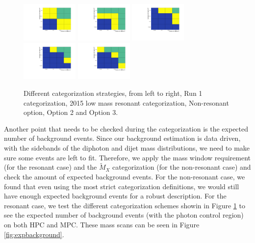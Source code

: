 \begin{figure}[thb]
  \centering
  \includegraphics[width=0.25\textwidth]{figures/sec-cats/catPlot_Run1}\hfil
  \includegraphics[width=0.25\textwidth]{figures/sec-cats/catPlot_2015}\hfil
  \includegraphics[width=0.25\textwidth]{figures/sec-cats/catPlot_NonRes}\hfil
  \includegraphics[width=0.25\textwidth]{figures/sec-cats/catPlot_DEF2}\hfil
  \includegraphics[width=0.25\textwidth]{figures/sec-cats/catPlot_DEF3}\hfil
  \caption{Different categorization strategies, from left to right, Run 1 categorization, 2015 low mass resonant categorization, Non-resonant option, Option 2 and Option 3.}
  \label{fig:differentcats}
\end{figure}

Another point that needs to be checked during the categorization is the expected number of background events. 
Since our background estimation is data driven, with the sidebands of the diphoton and dijet mass distributions, we need to make sure some events are left to fit. 
Therefore, we apply the mass window requirement (for the resonant case) and the $\tilde{M}_{X}$ categorization (for the non-resonant case) and check the amount of expected background events. 
For the non-resonant case, we found that even using the most strict categorization definitions, we would still have enough expected background events for a robust description. 
For the resonant case, we test the different categorization schemes showin in Figure \ref{fig:differentcats} to see the expected number of background events (with the photon control region) on both HPC and MPC. 
These mass scans can be seen in Figure \ref{fig:expbackground}. 

